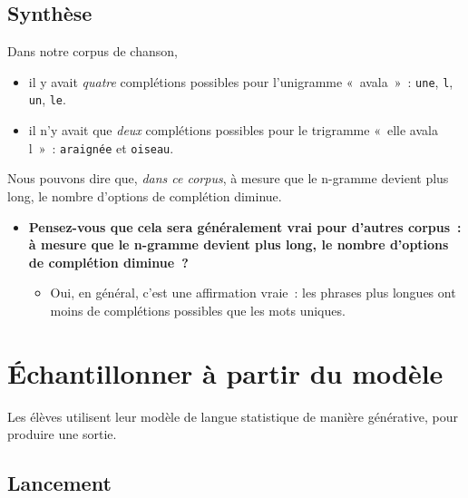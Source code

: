 \documentclass[12pt,a4paper]{article}
\begin{document}
\subsection{Synthèse}

\begin{thinkbox}
  Dans notre corpus de chanson,
  \begin{itemize}
    \item il y avait \emph{quatre} complétions possibles pour l'unigramme «~avala~»~: \texttt{une}, \texttt{l}, \texttt{un}, \texttt{le}.
    \item il n'y avait que \emph{deux} complétions possibles pour le trigramme «~elle avala l~»~: \texttt{araignée} et \texttt{oiseau}.
  \end{itemize}

  Nous pouvons dire que, \emph{dans ce corpus}, à mesure que le n-gramme devient plus long, le nombre d'options de complétion diminue.

  \begin{itemize}
    \item \textbf{Pensez-vous que cela sera généralement vrai pour d'autres corpus~: à mesure que le n-gramme devient plus long, le nombre d'options de complétion diminue~?}
    \begin{itemize}
      \item Oui, en général, c'est une affirmation vraie~: les phrases plus longues ont moins de complétions possibles que les mots uniques.
    \end{itemize}
  \end{itemize}
\end{thinkbox}

\newpage

\section{Échantillonner à partir du modèle}

\begin{overviewbox}
  Les élèves utilisent leur modèle de langue statistique de manière générative, pour produire une sortie.
\end{overviewbox}

\subsection{Lancement}
\end{document}
